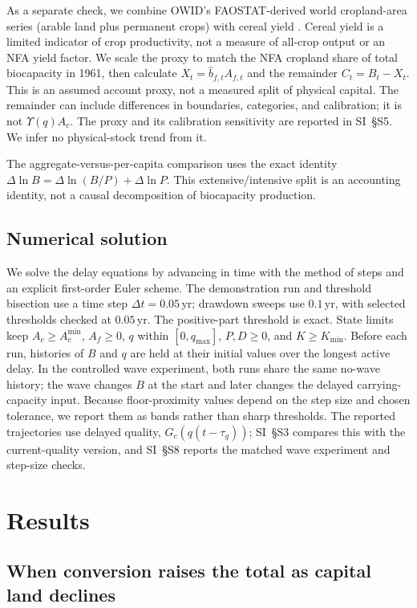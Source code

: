\documentclass[preprint,12pt,authoryear]{elsarticle}
\newcommand{\Acmin}{A_c^{\min}}
\begin{document}
As a separate check, we combine OWID's FAOSTAT-derived world cropland-area series (arable land plus permanent crops) with cereal yield \citep{OWIDCereal2026,OWIDCropland2026}. Cereal yield is a limited indicator of crop productivity, not a measure of all-crop output or an NFA yield factor. We scale the proxy to match the NFA cropland share of total biocapacity in 1961, then calculate $X_t=\hat b_{f,t}A_{f,t}$ and the remainder $C_t=B_t-X_t$. This is an assumed account proxy, not a measured split of physical capital. The remainder can include differences in boundaries, categories, and calibration; it is not $\Upsilon(q)A_c$. The proxy and its calibration sensitivity are reported in SI~\S S5. We infer no physical-stock trend from it.

The aggregate-versus-per-capita comparison uses the exact identity $\Delta\ln B=\Delta\ln(B/P)+\Delta\ln P$. This extensive/intensive split is an accounting identity, not a causal decomposition of biocapacity production.

\subsection{Numerical solution}\label{sec:numerics}

We solve the delay equations by advancing in time with the method of steps and an explicit first-order Euler scheme. The demonstration run and threshold bisection use a time step $\Delta t=0.05$\,yr; drawdown sweeps use $0.1$\,yr, with selected thresholds checked at $0.05$\,yr. The positive-part threshold is exact. State limits keep $A_c\ge\Acmin$, $A_f\ge0$, $q$ within $[0,q_{\max}]$, $P,D\ge0$, and $K\ge K_{\min}$. Before each run, histories of $B$ and $q$ are held at their initial values over the longest active delay. In the controlled wave experiment, both runs share the same no-wave history; the wave changes $B$ at the start and later changes the delayed carrying-capacity input. Because floor-proximity values depend on the step size and chosen tolerance, we report them as bands rather than sharp thresholds. The reported trajectories use delayed quality, $G_c(q(t-\tau_g))$; SI~\S S3 compares this with the current-quality version, and SI~\S S8 reports the matched wave experiment and step-size checks.
\section{Results}\label{sec:results}

\subsection{When conversion raises the total as capital land declines}\label{sec:mask}
\end{document}
